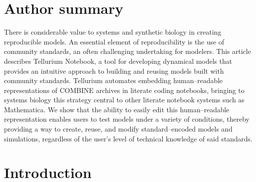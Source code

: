 \documentclass[10pt,letterpaper]{article}
\begin{document}
\section*{Author summary}
There is considerable value to systems and synthetic biology  in creating reproducible models. An essential element of reproducibility  is the use of community standards, an often challenging undertaking for modelers. This article describes Tellurium Notebook, a tool for developing dynamical models that provides an intuitive approach to building and reusing models built with community standards. Tellurium automates embedding human--readable representations of COMBINE archives in literate coding notebooks, bringing to systems biology this strategy central to other literate notebook systems such as Mathematica. We show that the ability to easily edit this human--readable representation enables users to test models under a variety of conditions, thereby providing a way to create, reuse, and modify standard--encoded models and simulations, regardless of the user's level of technical knowledge of said standards.
% 
% 
%
%

\linenumbers

\section*{Introduction}

\end{document}
